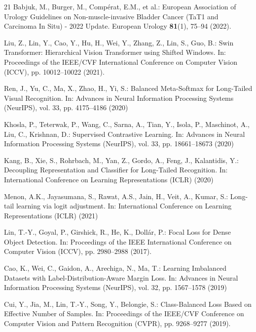 \documentclass[runningheads]{llncs}
\begin{document}
\begin{thebibliography}{21}
Babjuk, M., Burger, M., Compérat, E.M., et al.: European Association of Urology Guidelines on Non-muscle-invasive Bladder Cancer (TaT1 and Carcinoma In Situ) - 2022 Update. European Urology \textbf{81}(1), 75--94 (2022). 

Liu, Z., Lin, Y., Cao, Y., Hu, H., Wei, Y., Zhang, Z., Lin, S., Guo, B.: Swin Transformer: Hierarchical Vision Transformer using Shifted Windows. In: Proceedings of the IEEE/CVF International Conference on Computer Vision (ICCV), pp. 10012--10022 (2021). 

Ren, J., Yu, C., Ma, X., Zhao, H., Yi, S.: Balanced Meta-Softmax for Long-Tailed Visual Recognition. In: Advances in Neural Information Processing Systems (NeurIPS), vol. 33, pp. 4175--4186 (2020)

Khosla, P., Teterwak, P., Wang, C., Sarna, A., Tian, Y., Isola, P., Maschinot, A., Liu, C., Krishnan, D.: Supervised Contrastive Learning. In: Advances in Neural Information Processing Systems (NeurIPS), vol. 33, pp. 18661--18673 (2020)

Kang, B., Xie, S., Rohrbach, M., Yan, Z., Gordo, A., Feng, J., Kalantidis, Y.: Decoupling Representation and Classifier for Long-Tailed Recognition. In: International Conference on Learning Representations (ICLR) (2020)

Menon, A.K., Jayasumana, S., Rawat, A.S., Jain, H., Veit, A., Kumar, S.: Long-tail learning via logit adjustment. In: International Conference on Learning Representations (ICLR) (2021)

Lin, T.-Y., Goyal, P., Girshick, R., He, K., Dollár, P.: Focal Loss for Dense Object Detection. In: Proceedings of the IEEE International Conference on Computer Vision (ICCV), pp. 2980--2988 (2017). 

Cao, K., Wei, C., Gaidon, A., Arechiga, N., Ma, T.: Learning Imbalanced Datasets with Label-Distribution-Aware Margin Loss. In: Advances in Neural Information Processing Systems (NeurIPS), vol. 32, pp. 1567--1578 (2019)

Cui, Y., Jia, M., Lin, T.-Y., Song, Y., Belongie, S.: Class-Balanced Loss Based on Effective Number of Samples. In: Proceedings of the IEEE/CVF Conference on Computer Vision and Pattern Recognition (CVPR), pp. 9268--9277 (2019). 


\end{thebibliography}
\end{document}
